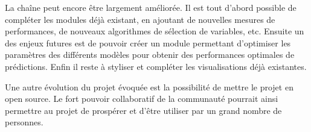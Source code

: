 La chaîne peut encore être largement améliorée. Il est tout d’abord possible de compléter les modules déjà existant, en ajoutant de nouvelles mesures de performances, de nouveaux algorithmes de sélection de variables, etc. Ensuite un des enjeux futures est de pouvoir créer un module permettant d’optimiser les paramètres des différents modèles pour obtenir des performances optimales de prédictions. Enfin il reste à styliser et compléter les visualisations déjà existantes.

Une autre évolution du projet évoquée est la possibilité de mettre le projet en open source. Le fort pouvoir collaboratif de la communauté pourrait ainsi permettre au projet de prospérer et d’être utiliser par un grand nombre de personnes.
